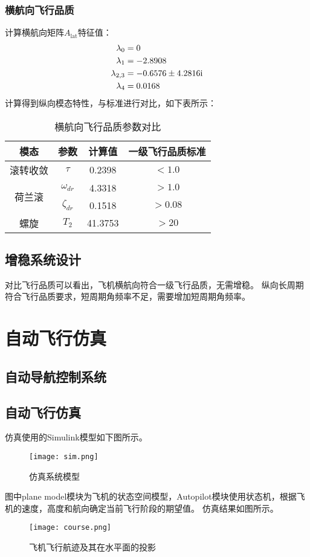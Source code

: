 \subsubsection{横航向飞行品质}
计算横航向矩阵$A_{\text{lat}}$特征值：
$$
\begin{aligned}
\lambda_0&=0\\
\lambda_{1}&=-2.8908\\
\lambda_{2,3}&=-0.6576\pm 4.2816{\mathrm i}\\
\lambda_{4}&=0.0168
\end{aligned}
$$
计算得到纵向模态特性，与标准进行对比，如下表所示：
\begin{table}[!h]
\centering
\caption{横航向飞行品质参数对比}
\begin{tabular}{@{}cccc@{}}
\toprule
模态&参数 & 计算值 & 一级飞行品质标准 \\ \midrule
滚转收敛&$\tau$&0.2398&$<1.0$\\ \midrule
\multirow{2}{*}{荷兰滚}&$\omega_{dr}$ & 4.3318 & $>1.0$ \\
&$\zeta_{dr}$ & 0.1518 & $>0.08$ \\ \midrule
螺旋&$T_2$ &41.3753 & $>20$ \\ \bottomrule
\end{tabular}
\end{table}

\subsection{增稳系统设计}
对比飞行品质可以看出，飞机横航向符合一级飞行品质，无需增稳。
纵向长周期符合飞行品质要求，短周期角频率不足，需要增加短周期角频率。

\clearpage
\section{自动飞行仿真}
\subsection{自动导航控制系统}

\subsection{自动飞行仿真}
仿真使用的Simulink模型如下图所示。
\begin{figure}[!h]
\centering\texttt{[image: sim.png]}
\caption{仿真系统模型}
\label{sim}
\end{figure}
图中plane model模块为飞机的状态空间模型，Autopilot模块使用状态机，根据飞机的速度，高度和航向确定当前飞行阶段的期望值。
仿真结果如图所示。
\begin{figure}[!h]
\centering\texttt{[image: course.png]}
\caption{飞机飞行航迹及其在水平面的投影}
\label{course}
\end{figure}

